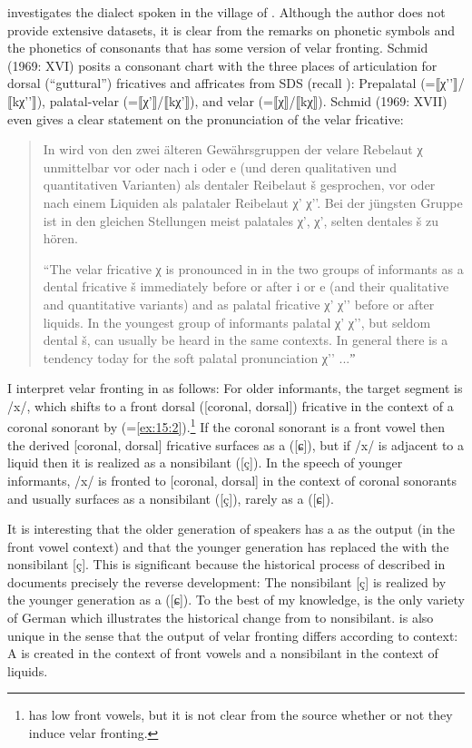 {\citet{Schmid1969} investigates the dialect spoken in the village of . Although the author does not provide extensive datasets, it is clear from the remarks on phonetic symbols and the phonetics of consonants that  has some version of velar fronting. Schmid (1969: XVI) posits a consonant chart with the three places of articulation for dorsal (“guttural”) fricatives and affricates from SDS (recall ): Prepalatal (=⟦χ'{}'⟧/⟦kχ'{}'⟧), palatal-velar (=⟦χ'⟧/⟦kχ'⟧), and velar (=⟦χ⟧/⟦kχ⟧). Schmid (1969: XVII) even gives a clear statement on the pronunciation of the velar fricative:\largerpage[2]

\begin{quote}
  In   wird von den zwei älteren Gewährsgruppen  der velare Rebelaut χ unmittelbar vor oder nach i oder e (und deren qualitativen und quantitativen Varianten) als dentaler Reibelaut š  gesprochen, vor oder nach einem Liquiden als palataler Reibelaut χ' χ'{}'.  Bei der jüngsten Gruppe ist in den gleichen Stellungen meist palatales χ', χ', selten dentales š zu hören.

  “The velar fricative χ is pronounced in  in the two groups of informants as a dental fricative š immediately before or after i or e (and their qualitative and quantitative variants) and as palatal fricative χ' χ'{}' before or after liquids. In the youngest group of informants palatal χ' χ'{}', but seldom dental š, can usually be heard in the same contexts. In general there is a tendency today for the soft palatal pronunciation χ'{}' ...ˮ
\end{quote}

I interpret velar fronting in  as follows: For older informants, the target segment is /x/, which shifts to a front dorsal ([coronal, dorsal]) fricative in the context of a coronal sonorant by  (=\ref{ex:15:2}).\footnote{{ has low front vowels, but it is not clear from the source whether or not they induce velar fronting.}} If the coronal sonorant is a front vowel then the derived [coronal, dorsal] fricative surfaces as a  ([ɕ]), but if /x/ is adjacent to a liquid then it is realized as a nonsibilant ([ç]). In the speech of younger informants, /x/ is fronted to [coronal, dorsal] in the context of coronal sonorants and usually surfaces as a nonsibilant ([ç]), rarely as a  ([ɕ]).

It is interesting that the older generation of speakers has a  as the output (in the front vowel context) and that the younger generation has replaced the  with the nonsibilant [ç]. This is significant because the historical process of  described in  documents precisely the reverse development: The nonsibilant [ç] is realized by the younger generation as a  ([ɕ]). To the best of my knowledge,  is the only variety of German which illustrates the historical change from  to nonsibilant.  is also unique in the sense that the output of velar fronting differs according to context: A  is created in the context of front vowels and a nonsibilant in the context of liquids.

}
